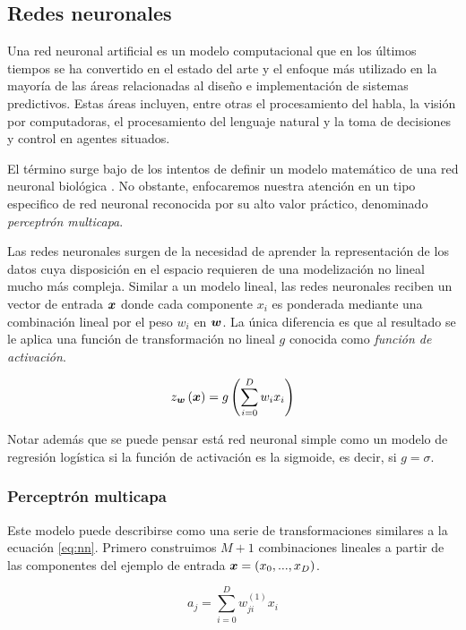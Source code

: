 \subsection{Redes neuronales}

Una red neuronal artificial es un modelo computacional que en los últimos
tiempos se ha convertido en el estado del arte y el enfoque más utilizado en la
mayoría de las áreas relacionadas al diseño e implementación de sistemas
predictivos. Estas áreas incluyen, entre otras el procesamiento del habla, la
visión por computadoras, el procesamiento del lenguaje natural y la toma de
decisiones y control en agentes situados.

El término surge bajo de los intentos de definir un modelo matemático de una red
neuronal biológica \citep{McCulloch-Pitts-1990}. No obstante, enfocaremos
nuestra atención en un tipo especifico de red neuronal reconocida por su alto
valor práctico, denominado \emph{perceptrón multicapa}.

Las redes neuronales surgen de la necesidad de aprender la representación de los
datos cuya disposición en el espacio requieren de una modelización no lineal
mucho más compleja. Similar a un modelo lineal, las redes neuronales reciben un
vector de entrada $\boldsymbol{x}$ donde cada componente $x_i$ es ponderada mediante
una combinación lineal por el peso $w_i$ en $\boldsymbol{w}$. La única diferencia es
que al resultado se le aplica una función de transformación no lineal $g$
conocida como \emph{función de activación}.

\begin{equation} \label{eq:nn}
    z_{\boldsymbol{w}}\left( \boldsymbol{x} \right) = g\left( \sum_{i=0}^{D} w_i x_i \right)
\end{equation}

Notar además que se puede pensar está red neuronal simple como un modelo de
regresión logística si la función de activación es la sigmoide, es decir, si $g
= \sigma$.

\subsubsection{Perceptrón multicapa}
\label{subch:multi_layer_perceptron}

Este modelo puede describirse como una serie de transformaciones similares a la
ecuación \ref{eq:nn}. Primero construimos $M + 1$ combinaciones lineales a
partir de las componentes del ejemplo de entrada $\boldsymbol{x} = (x_0, ..., x_D)$.

\begin{equation}
    a_j = \sum_{i = 0}^{D} w_{ji}^{(1)} x_{i}
\end{equation}

